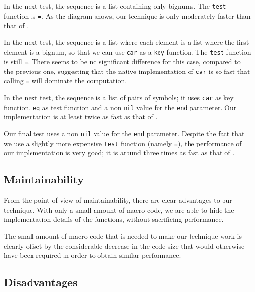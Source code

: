 
In the next test, the sequence is a list containing only bignums.  The
\texttt{test} function is \texttt{=}.  As the diagram shows, our
technique is only moderately faster than that of \sbcl{}.


In the next test, the sequence is a list where each element is a list
where the first element is a bignum, so that we can use \texttt{car}
as a \texttt{key} function.  The \texttt{test} function is still
\texttt{=}.  There seems to be no significant difference for this
case, compared to the previous one, suggesting that the native
implementation of \texttt{car} is so fast that calling \texttt{=} will
dominate the computation.


In the next test, the sequence is a list of pairs of symbols; it uses
\texttt{car} as key function, \texttt{eq} as test function and a non
\texttt{nil} value for the \texttt{end} parameter. Our implementation
is at least twice as fast as that of \sbcl{}.


Our final test uses a non \texttt{nil} value for the \texttt{end}
parameter.  Despite the fact that we use a slightly more expensive
\texttt{test} function (namely \texttt{=}), the performance of our
implementation is very good; it is around three times as fast as that
of \sbcl{}.


\subsection{Maintainability}

From the point of view of maintainability, there are clear advantages
to our technique.  With only a small amount of macro code, we are able
to hide the implementation details of the functions, without
sacrificing performance.

The small amount of macro code that is needed to make our technique
work is clearly offset by the considerable decrease in the code size
that would otherwise have been required in order to obtain similar
performance.

\subsection{Disadvantages}

